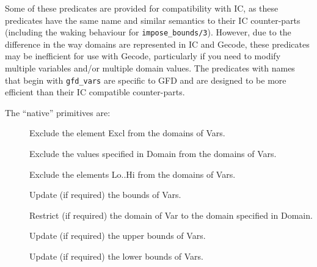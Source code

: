 Some of these predicates are provided for compatibility with IC, as these 
predicates have the same name and similar semantics to their IC counter-parts
(including the waking behaviour for {\tt impose_bounds/3}).
However, due to the difference in the way domains are represented in IC and
Gecode, these predicates may be inefficient for use with Gecode, particularly
if you need to modify multiple variables and/or multiple domain values. 
The predicates with names that begin with {\tt gfd_vars} are specific
to GFD and are designed to be more efficient than their IC compatible 
counter-parts.

The ``native'' primitives are:

\begin{description}
\item[]
Exclude the element Excl from the domains of Vars.

\item[]
Exclude the values specified in Domain from the domains of Vars.

\item[]
Exclude the elements Lo..Hi from the domains of Vars.

\item[]
Update (if required) the bounds of Vars.

\item[]
Restrict (if required) the domain of Var to the domain specified  in Domain.

\item[]
Update (if required) the upper bounds of Vars.

\item[]
Update (if required) the lower bounds of Vars.

\end{description}

